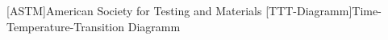 %
%
%

\tocless{}


\begin{acronym}[LONGESTLONGEST]
	
	[ASTM]{American Society for Testing and Materials}
	[TTT-Diagramm]{Time-Temperature-Transition Diagramm}

\end{acronym}


